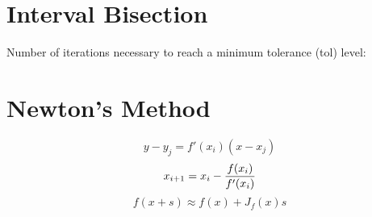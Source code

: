 \section{Interval Bisection}
Number of iterations necessary to reach a minimum tolerance (tol) level:
\begin{equation}
[log_2({b-a}\over tol)]
\end{equation}

\section{Newton's Method}
\begin{equation}
y-y_j=f'(x_i)(x-x_j)
\end{equation}
\begin{equation}
x_{i+1}=x_i-{f(x_i)\over f'(x_i)}
\end{equation}
\begin{equation}
f(x+ s) \approx f( x)+J_f(x)s
\end{equation}

